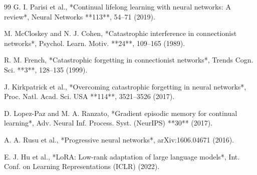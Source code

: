 \documentclass[10pt,twocolumn]{article}
\begin{document}
\begin{thebibliography}{99}
 G. I. Parisi et al., *Continual lifelong learning with neural networks: A review*, Neural Networks **113**, 54–71 (2019).

 M. McCloskey and N. J. Cohen, *Catastrophic interference in connectionist networks*, Psychol. Learn. Motiv. **24**, 109–165 (1989).

 R. M. French, *Catastrophic forgetting in connectionist networks*, Trends Cogn. Sci. **3**, 128–135 (1999).

 J. Kirkpatrick et al., *Overcoming catastrophic forgetting in neural networks*, Proc. Natl. Acad. Sci. USA **114**, 3521–3526 (2017).

 D. Lopez-Paz and M. A. Ranzato, *Gradient episodic memory for continual learning*, Adv. Neural Inf. Process. Syst. (NeurIPS) **30** (2017).

 A. A. Rusu et al., *Progressive neural networks*, arXiv:1606.04671 (2016).

 E. J. Hu et al., *LoRA: Low-rank adaptation of large language models*, Int. Conf. on Learning Representations (ICLR) (2022).
\end{thebibliography}
\end{document}
